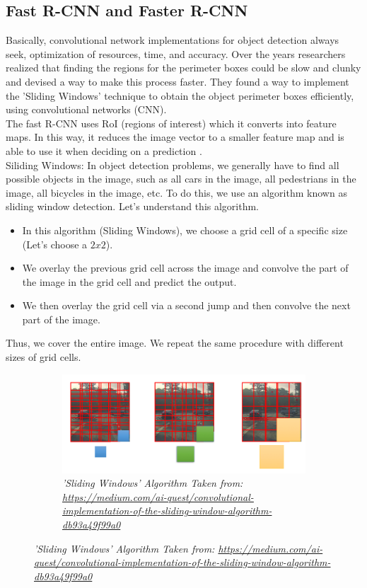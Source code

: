 \subsection{Fast R-CNN and Faster R-CNN}
Basically, convolutional network implementations for object detection always
seek, optimization of resources, time, and accuracy. Over the years researchers
realized that finding the regions for the perimeter boxes could be slow and
clunky and devised a way to make this process faster. They found a way to
implement the 'Sliding Windows' technique to obtain the object perimeter boxes
efficiently, using convolutional networks (CNN).\\

The fast R-CNN uses RoI (regions of interest) which it converts into feature
maps. In this way, it reduces the image vector to a smaller feature map and is
able to use it when deciding on a prediction \cite{rcnn_2}.\\

Siliding Windows: In object detection problems, we generally have to find all
possible objects in the image, such as all cars in the image, all pedestrians
in the image, all bicycles in the image, etc. To do this, we use an algorithm
known as sliding window detection. Let's understand this algorithm.

\begin{itemize}
    \item In this algorithm (Sliding Windows), we choose a grid cell of a
          specific size (Let's choose a $2x2$).
    \item We overlay the previous grid cell across the image and convolve the
          part of the image in the grid cell and predict the output.
    \item We then overlay the grid cell via a second jump and then convolve the
          next part of the image.
\end{itemize}

Thus, we cover the entire image. We repeat the same procedure with different
sizes of grid cells.

\begin{figure}[H]
    \centering
    \begin{subfigure}[b]{0.8\textwidth}
        \centering
        \includegraphics[width=\textwidth]{Figures/2. Related Work/rcnn_3.png}
        \caption{\textit{'Sliding Windows' Algorithm Taken from:
                \url{https://medium.com/ai-quest/convolutional-implementation-of-the-sliding-window-algorithm-db93a49f99a0}
            }}
    \end{subfigure}
\end{figure}

